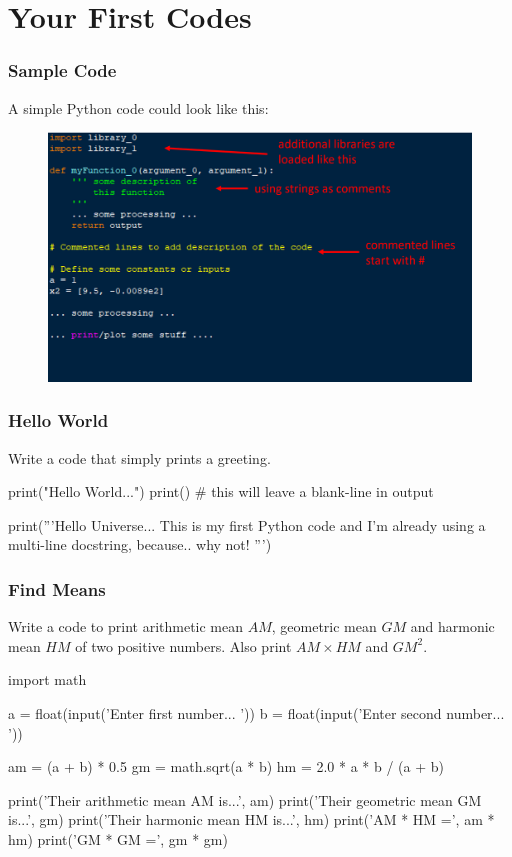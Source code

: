 \documentclass{beamer}
\begin{document}
\section{Your First Codes}

\begin{frame}
\frametitle{Sample Code}
A simple Python code could look like this:
\begin{figure}[H]
\centering
\includegraphics[width=\textwidth]{images/0_typical-code.png}
\end{figure}
\end{frame}

\begin{frame}[fragile]
\frametitle{Hello World}
Write a code that simply prints a greeting.
\begin{python}
print("Hello World...")
print()    # this will leave a blank-line in output

print('''Hello Universe...
This is my first Python code and I'm already
using a multi-line docstring, because.. why not!
''')
\end{python}
\end{frame}

\begin{frame}[fragile]
\frametitle{Find Means}
Write a code to print arithmetic mean $AM$, geometric mean $GM$ and harmonic mean $HM$ of two positive numbers. Also print $AM\times HM$ and $GM^2$.
\begin{python}
import math

a = float(input('Enter first number... '))
b = float(input('Enter second number... '))

am = (a + b) * 0.5
gm = math.sqrt(a * b)
hm = 2.0 * a * b / (a + b)

print('Their arithmetic mean AM is...', am)
print('Their geometric mean GM is...', gm)
print('Their harmonic mean HM is...', hm)
print('AM * HM =', am * hm)
print('GM * GM =', gm * gm)
\end{python}
\end{frame}
\end{document}
